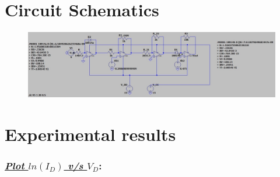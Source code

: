 \documentclass[12pt]{article}
\begin{document}
\newpage

\section{Circuit Schematics}
    \begin{figure}[h!]
        \hspace{-38mm}
        \includegraphics[scale = 0.6]{Sim_4_3.jpg}
    \end{figure}

\section{Experimental results}
\subsubsection*{\textit{\underline{Plot $ln(I_D)$ v/s $V_D$}}:}
\hspace{-5cm}
\begin{figure}[h!]
    \qquad
\end{figure}
\end{document}
